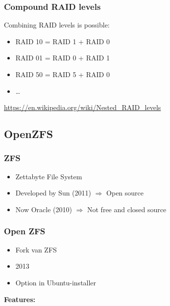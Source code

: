 \documentclass{article}
\begin{document}
\subsubsection{Compound RAID levels}

Combining RAID levels is possible:

\begin{itemize}
    \item RAID 10 = RAID 1 + RAID 0
    \item RAID 01 = RAID 0 + RAID 1
    \item RAID 50 = RAID 5 + RAID 0
    \item \dots
\end{itemize}

\url{https://en.wikipedia.org/wiki/Nested_RAID_levels}

\subsection{OpenZFS}

\subsubsection{ZFS}

\begin{itemize}
    \item Zettabyte File System
    \item Developed by Sun (2011) $\Rightarrow$ Open source
    \item Now Oracle (2010) $\Rightarrow$ Not free and closed source
\end{itemize}

\subsubsection{Open ZFS}

\begin{itemize}
    \item Fork van ZFS
    \item 2013
    \item Option in Ubuntu-installer
\end{itemize}

\textbf{Features:}
\end{document}
